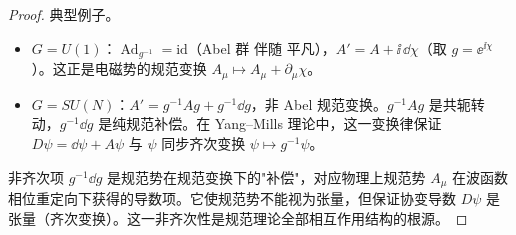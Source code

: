 \begin{proof}
典型例子。
\begin{itemize}
\item $G=U(1)$：$\operatorname{Ad}_{g^{-1}}=\mathrm{id}$（Abel 群 伴随 平凡），$A'=A+\ii\,\dd\chi$（取 $g=\ee^{\ii\chi}$）。这正是电磁势的规范变换 $A_\mu\mapsto A_\mu+\partial_\mu\chi$。
\item $G=SU(N)$：$A'=g^{-1}Ag+g^{-1}\dd g$，非 Abel 规范变换。$g^{-1}Ag$ 是共轭转动，$g^{-1}\dd g$ 是纯规范补偿。在 Yang--Mills 理论中，这一变换律保证 $D\psi=\dd\psi+A\psi$ 与 $\psi$ 同步齐次变换 $\psi\mapsto g^{-1}\psi$。
\end{itemize}

非齐次项 $g^{-1}\dd g$ 是规范势在规范变换下的"补偿"，对应物理上规范势 $A_\mu$ 在波函数相位重定向下获得的导数项。它使规范势不能视为张量，但保证协变导数 $D\psi$ 是张量（齐次变换）。这一非齐次性是规范理论全部相互作用结构的根源。
\end{proof}

